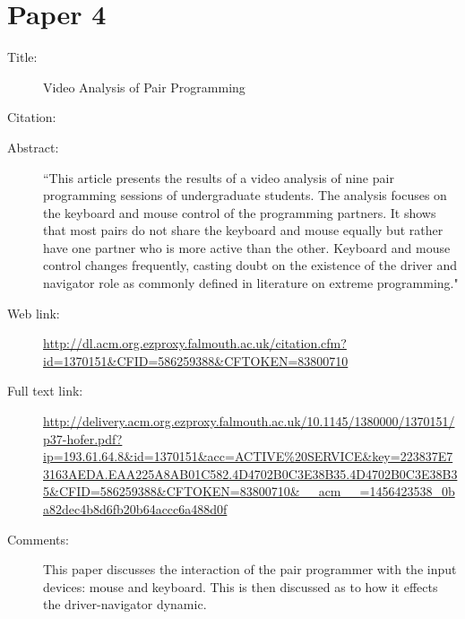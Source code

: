 \documentclass{scrartcl}
\begin{document}
\section*{Paper 4}
\begin{description}
\item[Title:] Video Analysis of Pair Programming
\item[Citation:] \cite{Hofer:2008}
\item[Abstract:] ``This article presents the results of a video analysis of nine pair programming sessions of undergraduate students. The analysis focuses on the keyboard and mouse control of the programming partners. It shows that most pairs do not share the keyboard and mouse equally but rather have one partner who is more active than the other. Keyboard and mouse control changes frequently, casting doubt on the existence of the driver and navigator role as commonly defined in literature on extreme programming."
\item[Web link:] \url{http://dl.acm.org.ezproxy.falmouth.ac.uk/citation.cfm?id=1370151&CFID=586259388&CFTOKEN=83800710}
\item[Full text link:] \url{http://delivery.acm.org.ezproxy.falmouth.ac.uk/10.1145/1380000/1370151/p37-hofer.pdf?ip=193.61.64.8&id=1370151&acc=ACTIVE%20SERVICE&key=223837E73163AEDA.EAA225A8AB01C582.4D4702B0C3E38B35.4D4702B0C3E38B35&CFID=586259388&CFTOKEN=83800710&__acm__=1456423538_0ba82dec4b8d6fb20b64accc6a488d0f}
\item[Comments:] This paper discusses the interaction of the pair programmer with the input devices: mouse and keyboard. This is then discussed as to how it effects the driver-navigator dynamic.
\end{description}
\end{document}
